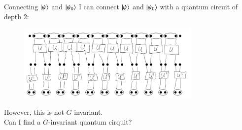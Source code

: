 \documentclass{beamer}
\begin{document}
\begin{frame}{Connecting $\ket{\psi}$ and $\ket{\psi_0}$}
	I can connect $\ket{\psi}$ and $\ket{\psi_0}$ with a quantum circuit of depth 2:
	\begin{figure}
		\center
		\includegraphics[width=0.8\textwidth]{ConnectingPsiAndPsi0.png}
	\end{figure}
	However, this is not $G$-invariant.\\
	\pause
	Can I find a $G$-invariant quantum cirquit?
\end{frame}
\end{document}
